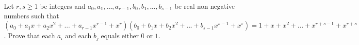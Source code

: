 Let \(r, s \geq 1\) be integers and \(a_{0}, a_{1}, . . . , a_{r-1}, b_{0}, b_{1}, . . . , b_{s-1} \) be real non-negative numbers such that \((a_0+a_1x+a_2x^2+. . .+a_{r-1}x^{r-1}+x^r)(b_0+b_1x+b_2x^2+. . .+b_{s-1}x^{s-1}+x^s) =1 +x+x^2+. . .+x^{r+s-1}+x^{r+s}\).
Prove that each \(a_i\) and each \(b_j\) equals either \(0\) or \(1\).